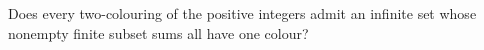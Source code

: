 Does every two-colouring of the positive integers admit an infinite set whose nonempty finite subset sums all have one colour?
